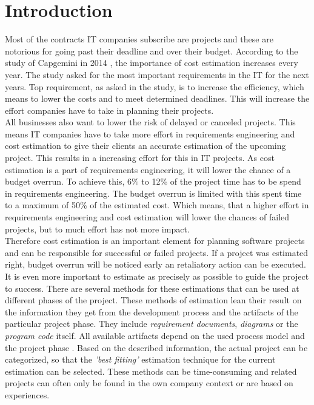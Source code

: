 \chapter{Introduction}

Most of the contracts IT companies subscribe are projects and these are notorious for going past their deadline and over their budget. According to the study of Capgemini in 2014 \cite{capgemini}, the importance of cost estimation increases every year. The study asked for the most important requirements in the IT for the next years. Top requirement, as asked in the study, is to increase the efficiency, which means to lower the costs and to meet determined deadlines. This will increase the effort companies have to take in planning their projects.\\
All businesses also want to lower the risk of delayed or canceled projects. This means IT companies have to take more effort in requirements engineering and cost estimation to give their clients an accurate estimation of the upcoming project. This results in a increasing effort for this in IT projects. As cost estimation is a part of requirements engineering, it will lower the chance of a budget overrun. To achieve this, 6\% to 12\% of the project time has to be spend in requirements engineering. The budget overrun is limited with this spent time to a maximum of 50\% of the estimated cost\cite{Partsch}. Which means, that a higher effort in requirements engineering and cost estimation will lower the chances of failed projects, but to much effort has not more impact.\\
Therefore cost estimation is an important element for planning software projects and can be responsible for successful or failed projects. If a project was estimated right, budget overrun will be noticed early an retaliatory action can be executed. It is even more important to estimate as precisely as possible to guide the project to success. There are several methods for these estimations that can be used at different phases of the project. These methods of estimation lean their result on the information they get from the development process and the artifacts of the particular project phase. They include \textit{requirement documents}, \textit{diagrams} or the \textit{program code} itself. All available artifacts depend on the used process model and the project phase \cite{EntwicklungKompakt}. Based on the described information, the actual project can be categorized, so that the \textit{'best fitting'} estimation technique for the current estimation can be selected. These methods can be time-consuming and related projects can often only be found in the own company context or are based on experiences.\\
